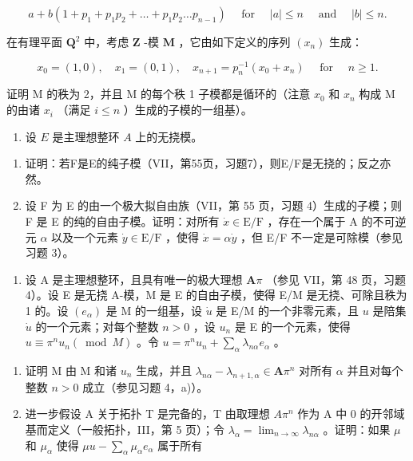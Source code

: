 \[
a + b \left(1 + p _ {1} + p _ {1} p _ {2} + \dots + p _ {1} p _ {2} \dots p _ {n - 1}\right) \quad \text { for } \quad | a | \leqslant n \quad \text { and } \quad | b | \leqslant n.
\]

在有理平面 \(\mathbf{Q}^2\) 中，考虑 \(\mathbf{Z}\) -模 \(\mathbf{M}\) ，它由如下定义的序列 \((x_n)\) 生成：

\[
x _ {0} = (1, 0), \quad x _ {1} = (0, 1), \quad x _ {n + 1} = p _ {n} ^ {- 1} \left(x _ {0} + x _ {n}\right) \quad \text { for } \quad n \geqslant 1.
\]

证明 M 的秩为 2，并且 M 的每个秩 1 子模都是循环的（注意 \(x_{0}\) 和 \(x_{n}\) 构成 M 的由诸 \(x_{i}\) （满足 \(i \leqslant n\) ）生成的子模的一组基）。

\begin{enumerate}
\def\labelenumi{\arabic{enumi})}
\setcounter{enumi}{3}
\tightlist
\item
  设 \(E\) 是主理想整环 \(A\) 上的无挠模。
\end{enumerate}

\begin{enumerate}
\def\labelenumi{\alph{enumi})}
\item
  证明：若F是E的纯子模（VII，第55页，习题7），则E/F是无挠的；反之亦然。
\item
  设 F 为 E 的由一个极大拟自由族（VII，第 55 页，习题 4）生成的子模；则 F 是 E 的纯的自由子模。证明：对所有 \(\dot{x} \in \mathrm{E} / \mathrm{F}\) ，存在一个属于 A 的不可逆元 \(\alpha\) 以及一个元素 \(\dot{y} \in \mathrm{E} / \mathrm{F}\) ，使得 \(\dot{x} = \alpha \dot{y}\) ，但 E/F 不一定是可除模（参见习题 3）。
\end{enumerate}

\begin{enumerate}
\def\labelenumi{\arabic{enumi})}
\setcounter{enumi}{4}
\tightlist
\item
  设 A 是主理想整环，且具有唯一的极大理想 \(\mathbf{A}\pi\) （参见 VII，第 48 页，习题 4）。设 E 是无挠 A-模，M 是 E 的自由子模，使得 E/M 是无挠、可除且秩为 1 的。设 \((e_{\alpha})\) 是 M 的一组基，设 \(\dot{u}\) 是 E/M 的一个非零元素，且 \(u\) 是陪集 \(\dot{u}\) 的一个元素；对每个整数 \(n > 0\) ，设 \(u_{n}\) 是 E 的一个元素，使得 \(u \equiv \pi^{n} u_{n} (\bmod M)\) 。令 \(u = \pi^{n} u_{n} + \sum_{\alpha} \lambda_{n\alpha} e_{\alpha}\) 。
\end{enumerate}

\begin{enumerate}
\def\labelenumi{\alph{enumi})}
\item
  证明 M 由 M 和诸 \(u_{n}\) 生成，并且 \(\lambda_{n\alpha} - \lambda_{n + 1,\alpha} \in \mathbf{A}\pi^n\) 对所有 \(\alpha\) 并且对每个整数 \(n > 0\) 成立（参见习题 4，a)）。
\item
  进一步假设 A 关于拓扑 T 是完备的，T 由取理想 \(A\pi^{n}\) 作为 A 中 0 的开邻域基而定义（一般拓扑，III，第 5 页）；令 \(\lambda_{\alpha} = \lim_{n \to \infty} \lambda_{n\alpha}\) 。证明：如果 \(\mu\) 和 \(\mu_{\alpha}\) 使得 \(\mu u - \sum_{\alpha} \mu_{\alpha} e_{\alpha}\) 属于所有
\end{enumerate}

